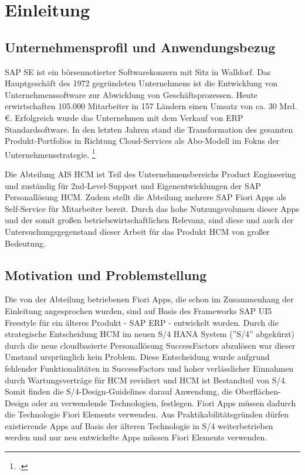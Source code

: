 \chapter{Einleitung}

\section{Unternehmensprofil und Anwendungsbezug}

SAP SE ist ein börsennotierter Softwarekonzern mit Sitz in Walldorf. Das Hauptgeschäft des 1972 gegründeten Unternehmens ist die Entwicklung von Unternehmenssoftware zur Abwicklung von Geschäftsprozessen. Heute erwirtschaften 105.000 Mitarbeiter in 157 Ländern einen Umsatz von ca. 30 Mrd. \euro{}. Erfolgreich wurde das Unternehmen mit dem Verkauf von ERP Standardsoftware. In den letzten Jahren stand die Transformation des gesamten Produkt-Portfolios in Richtung Cloud-Services als Abo-Modell im Fokus der Unternehmensstrategie. \footcite[Vgl.][]{sap_geschichte_2023}

Die Abteilung AIS HCM ist Teil des Unternehmensbereichs Product Engineering und zuständig für 2nd-Level-Support und Eigenentwicklungen der SAP Personallösung HCM. Zudem stellt die Abteilung mehrere SAP Fiori Apps als Self-Service für Mitarbeiter bereit. Durch das hohe Nutzungsvolumen dieser Apps und der somit gro{\ss}en betriebswirtschaftlichen Relevanz, sind diese und auch der Untersuchungsgegenstand dieser Arbeit für das Produkt HCM von gro{\ss}er Bedeutung.

\section{Motivation und Problemstellung}

Die von der Abteilung betriebenen Fiori Apps, die schon im Zusammenhang der Einleitung angesprochen wurden, sind auf Basis des Frameworks SAP UI5 Freestyle für ein älteres Produkt - SAP ERP - entwickelt worden. Durch die strategische Entscheidung HCM im neuen S/4 HANA System (''S/4'' abgekürzt) durch die neue cloudbasierte Personallösung SuccessFactors abzulösen war dieser Umstand ursprünglich kein Problem. Diese Entscheidung wurde aufgrund fehlender Funktionalitäten in SuccessFactors und hoher verlässlicher Einnahmen durch Wartungsverträge für HCM revidiert und HCM ist Bestandteil von S/4. Somit finden die S/4-Design-Guidelines darauf Anwendung, die \zB Oberflächen-Design oder zu verwendende Technologien, festlegen. Fiori Apps müssen dadurch die Technologie Fiori Elements verwenden. Aus Praktikabilitätsgründen dürfen existierende Apps auf Basis der älteren Technologie in S/4 weiterbetrieben werden und nur neu entwickelte Apps müssen Fiori Elements verwenden.


